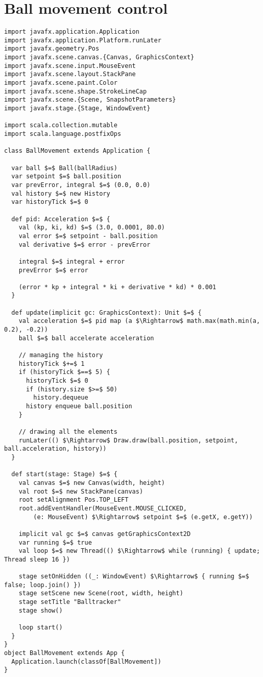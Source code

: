 \chapter{Ball movement control}
\label{app:ball-movement}

\begin{lstlisting}[style=ScalaStyle, caption={Ball movement control}, label={lst:ball-full-app}]
import javafx.application.Application
import javafx.application.Platform.runLater
import javafx.geometry.Pos
import javafx.scene.canvas.{Canvas, GraphicsContext}
import javafx.scene.input.MouseEvent
import javafx.scene.layout.StackPane
import javafx.scene.paint.Color
import javafx.scene.shape.StrokeLineCap
import javafx.scene.{Scene, SnapshotParameters}
import javafx.stage.{Stage, WindowEvent}

import scala.collection.mutable
import scala.language.postfixOps

class BallMovement extends Application {

  var ball $=$ Ball(ballRadius)
  var setpoint $=$ ball.position
  var prevError, integral $=$ (0.0, 0.0)
  val history $=$ new History
  var historyTick $=$ 0

  def pid: Acceleration $=$ {
    val (kp, ki, kd) $=$ (3.0, 0.0001, 80.0)
    val error $=$ setpoint - ball.position
    val derivative $=$ error - prevError

    integral $=$ integral + error
    prevError $=$ error

    (error * kp + integral * ki + derivative * kd) * 0.001
  }

  def update(implicit gc: GraphicsContext): Unit $=$ {
    val acceleration $=$ pid map (a $\Rightarrow$ math.max(math.min(a, 0.2), -0.2))
    ball $=$ ball accelerate acceleration

    // managing the history
    historyTick $+=$ 1
    if (historyTick $==$ 5) {
      historyTick $=$ 0
      if (history.size $>=$ 50)
        history.dequeue
      history enqueue ball.position
    }

    // drawing all the elements
    runLater(() $\Rightarrow$ Draw.draw(ball.position, setpoint, ball.acceleration, history))
  }

  def start(stage: Stage) $=$ {
    val canvas $=$ new Canvas(width, height)
    val root $=$ new StackPane(canvas)
    root setAlignment Pos.TOP_LEFT
    root.addEventHandler(MouseEvent.MOUSE_CLICKED,
        (e: MouseEvent) $\Rightarrow$ setpoint $=$ (e.getX, e.getY))

    implicit val gc $=$ canvas getGraphicsContext2D
    var running $=$ true
    val loop $=$ new Thread(() $\Rightarrow$ while (running) { update; Thread sleep 16 })

    stage setOnHidden ((_: WindowEvent) $\Rightarrow$ { running $=$ false; loop.join() })
    stage setScene new Scene(root, width, height)
    stage setTitle "Balltracker"
    stage show()

    loop start()
  }
}
object BallMovement extends App {
  Application.launch(classOf[BallMovement])
}
\end{lstlisting}

